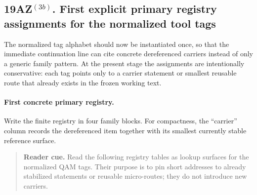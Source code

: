\subsection*{19AZ$^{(3b)}$. First explicit primary registry assignments for the normalized tool tags}
\label{sec:first-explicit-primary-registry-assignments}
The normalized tag alphabet should now be instantiated once, so that the immediate continuation line can cite concrete dereferenced carriers instead of only a generic family pattern. At the present stage the assignments are intentionally conservative: each tag points only to a carrier statement or smallest reusable route that already exists in the frozen working text.

\paragraph{First concrete primary registry.}
Write the finite registry in four family blocks. For compactness, the ``carrier'' column records the dereferenced item together with its smallest currently stable reference surface.
\begin{quote}\small
\noindent\textbf{Reader cue.} Read the following registry tables as lookup surfaces for the normalized QAM tags. Their purpose is to pin short addresses to already stabilized statements or reusable micro-routes; they do not introduce new carriers.
\end{quote}

